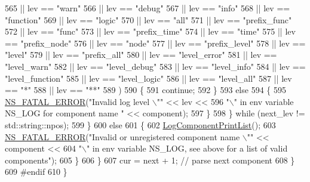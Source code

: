 \begin{DoxyCode}
565                       || lev == \textcolor{stringliteral}{"warn"}
566                       || lev == \textcolor{stringliteral}{"debug"}
567                       || lev == \textcolor{stringliteral}{"info"}
568                       || lev == \textcolor{stringliteral}{"function"}
569                       || lev == \textcolor{stringliteral}{"logic"}
570                       || lev == \textcolor{stringliteral}{"all"}
571                       || lev == \textcolor{stringliteral}{"prefix\_func"}
572                       || lev == \textcolor{stringliteral}{"func"}
573                       || lev == \textcolor{stringliteral}{"prefix\_time"}
574                       || lev == \textcolor{stringliteral}{"time"}
575                       || lev == \textcolor{stringliteral}{"prefix\_node"}
576                       || lev == \textcolor{stringliteral}{"node"}
577                       || lev == \textcolor{stringliteral}{"prefix\_level"}
578                       || lev == \textcolor{stringliteral}{"level"}
579                       || lev == \textcolor{stringliteral}{"prefix\_all"}
580                       || lev == \textcolor{stringliteral}{"level\_error"}
581                       || lev == \textcolor{stringliteral}{"level\_warn"}
582                       || lev == \textcolor{stringliteral}{"level\_debug"}
583                       || lev == \textcolor{stringliteral}{"level\_info"}
584                       || lev == \textcolor{stringliteral}{"level\_function"}
585                       || lev == \textcolor{stringliteral}{"level\_logic"}
586                       || lev == \textcolor{stringliteral}{"level\_all"}
587                       || lev == \textcolor{stringliteral}{"*"}
588                       || lev == \textcolor{stringliteral}{"**"}
589                      )
590                     \{
591                       \textcolor{keywordflow}{continue};
592                     \}
593                   \textcolor{keywordflow}{else}
594                     \{
595                       \hyperlink{group__fatal_ga5131d5e3f75d7d4cbfd706ac456fdc85}{NS\_FATAL\_ERROR}(\textcolor{stringliteral}{"Invalid log level \(\backslash\)""} << lev <<
596                                      \textcolor{stringliteral}{"\(\backslash\)" in env variable NS\_LOG for component name "} << component);
597                     \}
598                 \} \textcolor{keywordflow}{while} (next\_lev != std::string::npos);
599             \}
600           \textcolor{keywordflow}{else} 
601             \{
602               \hyperlink{namespacens3_a5252703c3f8260fd6dc609f1b276e57c}{LogComponentPrintList}();
603               \hyperlink{group__fatal_ga5131d5e3f75d7d4cbfd706ac456fdc85}{NS\_FATAL\_ERROR}(\textcolor{stringliteral}{"Invalid or unregistered component name \(\backslash\)""} << component <<
604                              \textcolor{stringliteral}{"\(\backslash\)" in env variable NS\_LOG, see above for a list of valid components"});
605             \}
606         \}
607       cur = next + 1;   \textcolor{comment}{// parse next component}
608     \}
609 \textcolor{preprocessor}{#endif}
610 \}
\end{DoxyCode}



